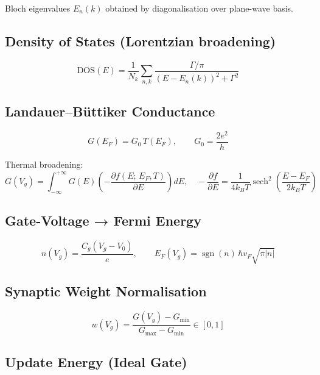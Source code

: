 \documentclass[12pt, a4paper]{article}
\newcommand{\DOS}{\mathrm{DOS}}
\newcommand{\hf}{\hbar v_F}
\begin{document}
Bloch eigenvalues $E_n(k)$ obtained by diagonalisation over plane-wave basis.

\subsection{Density of States (Lorentzian broadening)}

\begin{equation}\label{eq:dos}
  \DOS(E) = \frac{1}{N_k}\sum_{n,k}
  \frac{\Gamma/\pi}{(E - E_n(k))^2 + \Gamma^2}
\end{equation}

\subsection{Landauer–Büttiker Conductance}

\begin{equation}\label{eq:landauer}
  G(E_F) = G_0\,T(E_F), \qquad G_0 = \frac{2e^2}{h}
\end{equation}

Thermal broadening:
\begin{equation}\label{eq:thermal_G}
  G(V_g) = \int_{-\infty}^{+\infty}
  G(E)\left(-\frac{\partial f(E;\,E_F,T)}{\partial E}\right) dE,
  \quad
  -\frac{\partial f}{\partial E}
  = \frac{1}{4k_BT}\operatorname{sech}^2\!\left(\frac{E-E_F}{2k_BT}\right)
\end{equation}

\subsection{Gate-Voltage → Fermi Energy}

\begin{equation}\label{eq:gate_ef}
  n(V_g) = \frac{C_g(V_g - V_0)}{e},
  \qquad
  E_F(V_g) = \operatorname{sgn}(n)\,\hf\sqrt{\pi|n|}
\end{equation}

\subsection{Synaptic Weight Normalisation}

\begin{equation}\label{eq:weight}
  w(V_g) = \frac{G(V_g) - G_{\min}}{G_{\max} - G_{\min}} \in [0,1]
\end{equation}

\subsection{Update Energy (Ideal Gate)}
\end{document}

